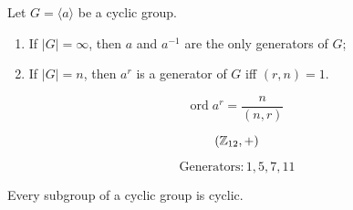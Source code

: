 \begin{frame}
  \begin{theorem}
    Let $G = \langle a \rangle$ be a cyclic group.
    \begin{enumerate}[<+->][(1)]
      \setlength{\itemsep}{6pt}
      \item If $|G| = \infty$, then $a$ and $a^{-1}$ are the only generators of $G$;
      \item If $|G| = n$, then $a^{r}$ is a generator of $G$ iff $(r, n) = 1$.
    \end{enumerate}
  \end{theorem}

  \pause
  \[
    \text{ord}\; a^{r} = \frac{n}{(n, r)}
  \]
\end{frame}

\begin{frame}{}
  \[
    (\mathbb{Z}_{12}, +)
  \]

  \[
    \text{Generators}: 1, 5, 7, 11
  \]
\end{frame}

\begin{frame}{}
  \begin{theorem}
    Every subgroup of a cyclic group is cyclic.
  \end{theorem}
\end{frame}
